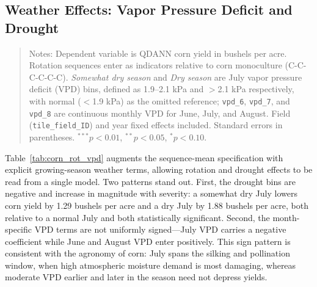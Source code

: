 \documentclass[12pt,letterpaper]{article}
\theoremstyle{remark}
\theoremstyle{remark}
\theoremstyle{plain}
\theoremstyle{definition}
\begin{document}
\subsection{\label{subsec:vpd_effects}Weather Effects: Vapor Pressure Deficit and Drought}


\begin{quote}
\small
Notes: Dependent variable is QDANN corn yield in bushels per acre. Rotation
sequences enter as indicators relative to corn monoculture (C-C-C-C-C-C).
\emph{Somewhat dry season} and \emph{Dry season} are July vapor pressure deficit
(VPD) bins, defined as 1.9--2.1 kPa and $>$2.1 kPa respectively, with normal
($<$1.9 kPa) as the omitted reference; \texttt{vpd\_6}, \texttt{vpd\_7}, and
\texttt{vpd\_8} are continuous monthly VPD for June, July, and August. Field
(\texttt{tile\_field\_ID}) and year fixed effects included. Standard errors in
parentheses. $^{***}p<0.01$, $^{**}p<0.05$, $^{*}p<0.10$.
\end{quote}

Table~\ref{tab:corn_rot_vpd} augments the sequence-mean specification with
explicit growing-season weather terms, allowing rotation and drought effects to
be read from a single model. Two patterns stand out. First, the drought bins are
negative and increase in magnitude with severity: a somewhat dry July lowers corn
yield by 1.29 bushels per acre and a dry July by 1.88 bushels per acre, both
relative to a normal July and both statistically significant. Second, the
month-specific VPD terms are not uniformly signed---July VPD carries a negative
coefficient while June and August VPD enter positively. This sign pattern is
consistent with the agronomy of corn: July spans the silking and pollination
window, when high atmospheric moisture demand is most damaging, whereas moderate
VPD earlier and later in the season need not depress yields.
\end{document}
